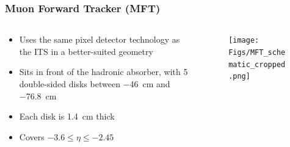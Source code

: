 \documentclass[11pt]{beamer}
\begin{document}
\begin{frame}
    \frametitle{Muon Forward Tracker (MFT)}

    \begin{columns}[c]
        \begin{column}{0.5\textwidth}
            \begin{itemize}
                \item Uses the same pixel detector technology as the ITS in a better-suited geometry
                \item Sits in front of the hadronic absorber, with 5 double-sided disks between \SI{-46}{\centi\metre} and \SI{-76.8}{\centi\metre}
                \item Each disk is \SI{1.4}{\centi\metre} thick
                \item Covers $-3.6\leq\eta\leq -2.45$
            \end{itemize}
        \end{column}

        \begin{column}{0.5\textwidth}
            \begin{figure}[h]
                \begin{center}
                    \texttt{[image: Figs/MFT\_schematic\_cropped.png]}
                \end{center}
            \end{figure}
        \end{column}
    \end{columns}

\end{frame}
\end{document}
